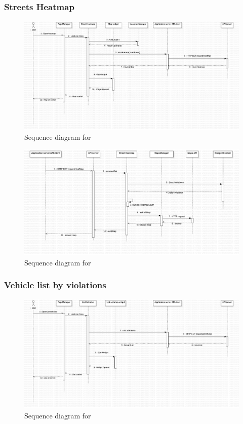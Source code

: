 \subsubsection{Streets Heatmap}
\begin{figure}[H]
\centering
\includegraphics[width=\textwidth]{Images/DDSeqAppMap.png}
\caption{\label{fig:DDSeqSeverForm} Sequence diagram for }
\end{figure}

\begin{figure}[H]
\centering
\includegraphics[width=\textwidth]{Images/DDSeqSeverMap.png}
\caption{\label{fig:DDSeqSeverForm} Sequence diagram for }
\end{figure}


\subsubsection{Vehicle list by violations}
\begin{figure}[H]
\centering
\includegraphics[width=\textwidth]{Images/DDSeqAppList.png}
\caption{\label{fig:DDSeqAppList} Sequence diagram for }
\end{figure}

